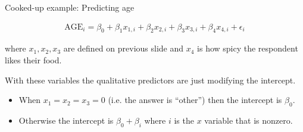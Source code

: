 \documentclass[aspectratio=169]{beamer}
\begin{document}
\begin{frame}{Cooked-up example:  Predicting age}

\begin{align*}
\text{AGE}_i = \beta_0 + \beta_1 x_{1,i} + \beta_2 x_{2,i} + \beta_3 x_{3,i} + \beta_4 x_{4,i} + \epsilon_i
\end{align*}

where $x_{1}, x_2, x_3$ are defined on previous slide and $x_4$ is how spicy the respondent likes their food.

\vspace{5mm}

With these variables the qualitative predictors are just modifying the intercept.  
\begin{itemize}
\item When $x_1=x_2=x_3=0$ (i.e. the answer is ``other'') then the intercept is $\beta_0$.
\item Otherwise the intercept is $\beta_0+\beta_i$ where $i$ is the $x$ variable that is nonzero.
\end{itemize}

\end{frame}
\end{document}
